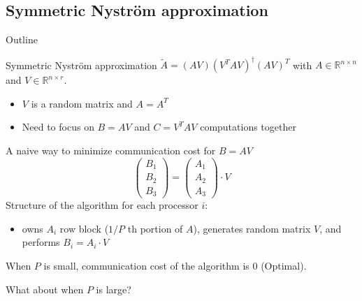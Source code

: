 \documentclass[aspectratio=169]{beamer}
\begin{document}
\subsection{Symmetric Nyström approximation}
\begin{frame}{Outline}
	\tableofcontents[currentsubsection]
\end{frame}


	\begin{frame}{Symmetric Nyström approximation}
	$\tilde{A} = (AV) (V^TAV)^\dagger(AV)^T$
	with $A \in \mathbb{R}^{n\times n}$ and $V \in \mathbb{R}^{n\times r}$.
	\vfill
	\begin{itemize}
		\item $V$ is a random matrix and $A=A^T$ 
		\vfill
		\item Need to focus on $B=AV$ and $C=V^TAV$ computations together
	\end{itemize}
	\vfill
	\begin{block}{A naive way to minimize communication cost for $B=AV$}
		$$\begin{pmatrix}
		B_1\\
		B_2\\
		B_3		
		\end{pmatrix}=\begin{pmatrix}
			A_1\\
			A_2\\
			A_3		
		\end{pmatrix}\cdot V$$
			\vfill
		Structure of the algorithm for each processor $i$:
		\begin{itemize}
			\item owns $A_i$ row block ($1/P$ th portion of $A$), generates random matrix $V$, and \\performs $B_i = A_i \cdot V$ 
		\end{itemize}
		\vfill
		When $P$ is small, communication cost of the algorithm is $0$ (\alert{Optimal}).
	\end{block}

	\vfill
	\begin{center}	
		\alert{What about when $P$ is large?}
	\end{center}

	\vfill
	\end{frame}
\end{document}
